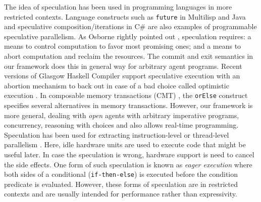 
The idea of speculation has been used in programming languages
in more restricted contexts. 
%
Language constructs such as {\tt future} in Multilisp 
\cite{Osborne1990:multilisp} and Java \cite{WelcJH05}
and speculative composition/iterations in C\# \cite{PrabhuRV10}
are also examples of programmable speculative parallelism.
As Osborne rightly pointed out \cite{Osborne1990:multilisp}, 
speculation requires: a means to
control computation to favor most promising ones; and a means to
abort computation and reclaim the resources. 
The commit and exit semantics in our framework does this in general way
for arbitrary agent programs.
Recent versions of Glasgow Haskell Compiler support speculative execution with 
an abortion mechanism to back out in case of a bad choice called 
optimistic execution \cite{EnnalsJ03:optimisitic}.
In composable memory transactions (CMT) \cite{Harris05:CMT}, 
the {\tt orElse} construct specifies several alternatives 
in memory transactions.
However, our framework is more general, dealing with {\em open} agents
with arbitrary imperative programs, concurrency, reasoning with choices
and also allows real-time programming.
Speculation has been used 
for extracting instruction-level or thread-level parallelism 
\cite{Hammond1998:DSS}. 
Here, idle hardware units are used to execute code that might be useful
later. In case the speculation is wrong, hardware support is need to
cancel the side effects. 
One form of such speculation is known as
{\em eager execution} \cite{Uht1995:DEE} where both sides of 
a conditional ({\tt if-then-else}) 
is executed before the condition predicate is evaluated. 
However, these forms of speculation are in restricted contexts and
are usually intended for performance rather than expressivity.


